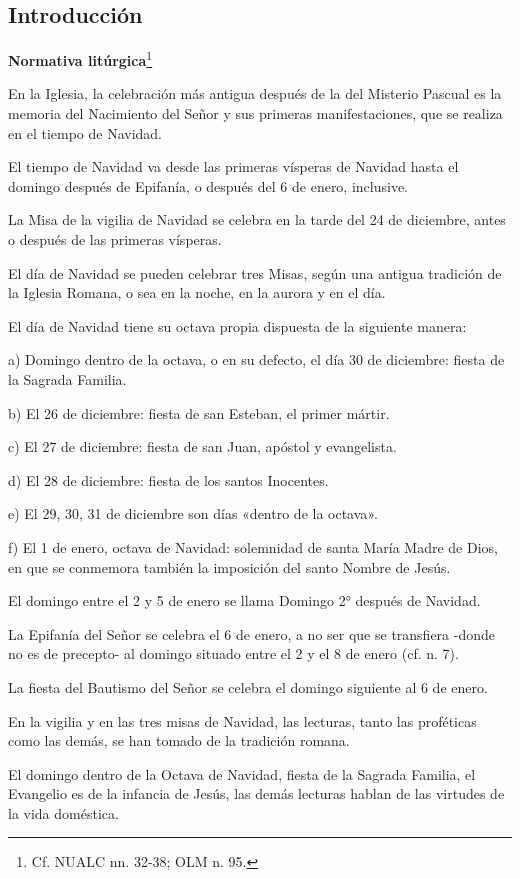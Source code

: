 \documentclass[]{article}
\begin{document}
\subsection{Introducción}\label{introducciuxf3n-1}

\textbf{Normativa litúrgica}\footnote{Cf. NUALC nn. 32-38; OLM n. 95.}

En la Iglesia, la celebración más antigua después de la del Misterio
Pascual es la memoria del Nacimiento del Señor y sus primeras
manifestaciones, que se realiza en el tiempo de Navidad.

El tiempo de Navidad va desde las primeras vísperas de Navidad hasta el
domingo después de Epifanía, o después del 6 de enero, inclusive.

La Misa de la vigilia de Navidad se celebra en la tarde del 24 de
diciembre, antes o después de las primeras vísperas.

El día de Navidad se pueden celebrar tres Misas, según una antigua
tradición de la Iglesia Romana, o sea en la noche, en la aurora y en el
día.

El día de Navidad tiene su octava propia dispuesta de la siguiente
manera:

a) Domingo dentro de la octava, o en su defecto, el día 30 de diciembre:
fiesta de la Sagrada Familia.

b) El 26 de diciembre: fiesta de san Esteban, el primer mártir.

c) El 27 de diciembre: fiesta de san Juan, apóstol y evangelista.

d) El 28 de diciembre: fiesta de los santos Inocentes.

e) El 29, 30, 31 de diciembre son días «dentro de la octava».

f) El 1 de enero, octava de Navidad: solemnidad de santa María Madre de
Dios, en que se conmemora también la imposición del santo Nombre de
Jesús.

El domingo entre el 2 y 5 de enero se llama Domingo 2° después de
Navidad.

La Epifanía del Señor se celebra el 6 de enero, a no ser que se
transfiera -donde no es de precepto- al domingo situado entre el 2 y el
8 de enero (cf. n. 7).

La fiesta del Bautismo del Señor se celebra el domingo siguiente al 6 de
enero.

En la vigilia y en las tres misas de Navidad, las lecturas, tanto las
proféticas como las demás, se han tomado de la tradición romana.

El domingo dentro de la Octava de Navidad, fiesta de la Sagrada Familia,
el Evangelio es de la infancia de Jesús, las demás lecturas hablan de
las virtudes de la vida doméstica.
\end{document}
